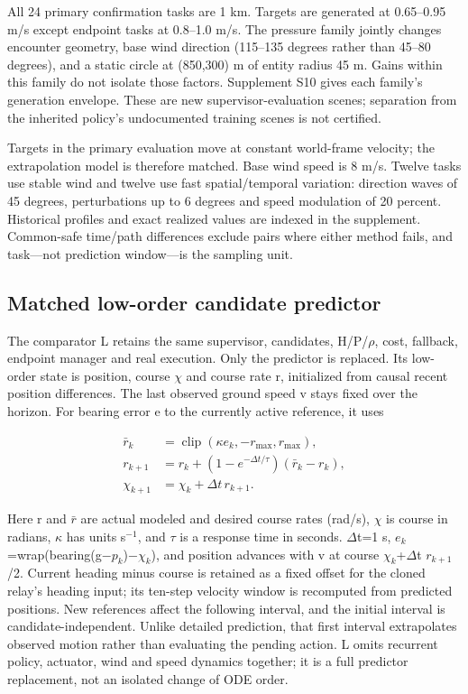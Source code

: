 \documentclass[conference]{IEEEtran}
\begin{document}
All 24 primary confirmation tasks are 1 km. Targets are generated at 0.65--0.95 m/s except endpoint tasks at 0.8--1.0 m/s. The pressure family jointly changes encounter geometry, base wind direction (115--135 degrees rather than 45--80 degrees), and a static circle at (850,300) m of entity radius 45 m. Gains within this family do not isolate those factors. Supplement S10 gives each family's generation envelope. These are new supervisor-evaluation scenes; separation from the inherited policy's undocumented training scenes is not certified.

Targets in the primary evaluation move at constant world-frame velocity; the extrapolation model is therefore matched. Base wind speed is 8 m/s. Twelve tasks use stable wind and twelve use fast spatial/temporal variation: direction waves of 45 degrees, perturbations up to 6 degrees and speed modulation of 20 percent. Historical profiles and exact realized values are indexed in the supplement. Common-safe time/path differences exclude pairs where either method fails, and task---not prediction window---is the sampling unit.

\subsection{Matched low-order candidate predictor}

The comparator L retains the same supervisor, candidates, H/P/\ensuremath{\rho}, cost, fallback, endpoint manager and real execution. Only the predictor is replaced. Its low-order state is position, course \ensuremath{\chi} and course rate r, initialized from causal recent position differences. The last observed ground speed v stays fixed over the horizon. For bearing error e to the currently active reference, it uses

\begin{equation}\label{eq:6}
\begin{aligned}\bar r_k&=\operatorname{clip}(\kappa e_k,-r_{\max},r_{\max}),\\r_{k+1}&=r_k+(1-e^{-\Delta t/\tau})(\bar r_k-r_k),\\\chi_{k+1}&=\chi_k+\Delta t\,r_{k+1}.\end{aligned}
\end{equation}

Here r and $\bar r$ are actual modeled and desired course rates (rad/s), \ensuremath{\chi} is course in radians, \ensuremath{\kappa} has units s$^{-1}$, and \ensuremath{\tau} is a response time in seconds. \ensuremath{\Delta}t=1 s, $e_k$=wrap(bearing(g\ensuremath{-}$p_k$)\ensuremath{-}$\chi_k$), and position advances with v at course $\chi_k$+\ensuremath{\Delta}t $r_{k+1}$/2. Current heading minus course is retained as a fixed offset for the cloned relay's heading input; its ten-step velocity window is recomputed from predicted positions. New references affect the following interval, and the initial interval is candidate-independent. Unlike detailed prediction, that first interval extrapolates observed motion rather than evaluating the pending action. L omits recurrent policy, actuator, wind and speed dynamics together; it is a full predictor replacement, not an isolated change of ODE order.
\end{document}
